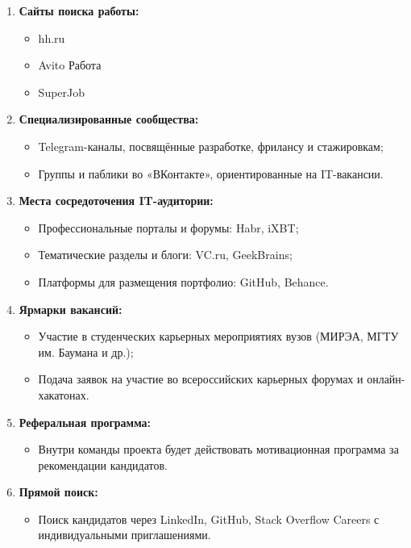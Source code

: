 \documentclass[14pt, russian]{matmex-diploma-custom}
\begin{document}
\begin{enumerate}
    \item \textbf{Сайты поиска работы:}
    \begin{itemize}
        \item hh.ru
        \item Avito Работа
        \item SuperJob
    \end{itemize}

    \item \textbf{Специализированные сообщества:}
    \begin{itemize}
        \item Telegram-каналы, посвящённые разработке, фрилансу и стажировкам;
        \item Группы и паблики во «ВКонтакте», ориентированные на IT-вакансии.
    \end{itemize}

    \item \textbf{Места сосредоточения IT-аудитории:}
    \begin{itemize}
        \item Профессиональные порталы и форумы: Habr, iXBT;
        \item Тематические разделы и блоги: VC.ru, GeekBrains;
        \item Платформы для размещения портфолио: GitHub, Behance.
    \end{itemize}

    \item \textbf{Ярмарки вакансий:}
    \begin{itemize}
        \item Участие в студенческих карьерных мероприятиях вузов (МИРЭА, МГТУ им. Баумана и др.);
        \item Подача заявок на участие во всероссийских карьерных форумах и онлайн-хакатонах.
    \end{itemize}

    \item \textbf{Реферальная программа:}
    \begin{itemize}
        \item Внутри команды проекта будет действовать мотивационная программа за рекомендации кандидатов.
    \end{itemize}

    \item \textbf{Прямой поиск:}
    \begin{itemize}
        \item Поиск кандидатов через LinkedIn, GitHub, Stack Overflow Careers с индивидуальными приглашениями.
    \end{itemize}
\end{enumerate}
\end{document}
